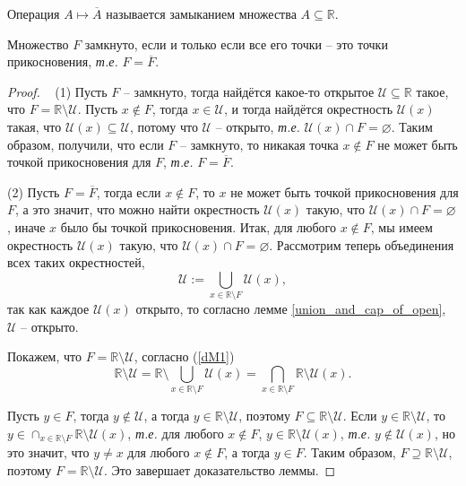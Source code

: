 \begin{definition}
    Операция $A \mapsto \overline{A}$ называется замыканием множества $A\subseteq \mathbb{R}.$
\end{definition}


\begin{lemma}\label{closure}
    Множество $F$ замкнуто, если и только если все его точки -- это точки прикосновения, \textit{т.е.} $F = \overline{F}.$ 
\end{lemma}
\begin{proof}~
 (1) Пусть $F$ -- замкнуто, тогда найдётся какое-то открытое $\mathscr{U} \subseteq \mathbb{R}$ такое, что $F  = \mathbb{R} \setminus \mathscr{U}$. Пусть $x \notin F$, тогда $x \in \mathscr{U}$, и тогда найдётся окрестность $\mathscr{U}(x)$ такая, что $\mathscr{U}(x) \subseteq \mathscr{U}$, потому что $\mathscr{U}$ -- открыто, \textit{т.е.} $\mathscr{U}(x) \cap F = \varnothing.$ Таким образом, получили, что если $F$ -- замкнуто, то никакая точка $x \notin F$ не может быть точкой прикосновения для $F$, \textit{т.е.} $F = \overline{F}.$ 

(2) Пусть $F = \overline{F}$, тогда если $x \notin F$, то $x$ не может быть точкой прикосновения для $F$, а это значит, что можно найти окрестность $\mathscr{U}(x)$ такую, что $\mathscr{U}(x) \cap F = \varnothing$, иначе $x$ было бы точкой прикосновения. Итак, для любого $x \notin F$, мы имеем окрестность $\mathscr{U}(x)$ такую, что $\mathscr{U}(x) \cap F = \varnothing$. Рассмотрим теперь объединения всех таких окрестностей,
\[
 \mathscr{U}:= \bigcup_{x \in \mathbb{R}\setminus F} \mathscr{U}(x),
\]
так как каждое $\mathscr{U}(x)$ открыто, то согласно лемме \ref{union_and_cap_of_open}, $\mathscr{U}$ -- открыто. 

Покажем, что $F = \mathbb{R} \setminus \mathscr{U}$, согласно (\ref{dM1})
\[
 \mathbb{R} \setminus \mathscr{U} = \mathbb{R} \setminus \bigcup_{x \in \mathbb{R}\setminus F} \mathscr{U}(x) = \bigcap_{x \in \mathbb{R} \setminus F} \mathbb{R} \setminus \mathscr{U}(x).
\]

Пусть $y \in F$, тогда $y \notin \mathscr{U}$, а тогда $y \in \mathbb{R}\setminus \mathscr{U}$, поэтому $F \subseteq \mathbb{R} \setminus \mathscr{U}$. Если $y \in \mathbb{R}\setminus \mathscr{U}$, то $y \in \cap_{x \in \mathbb{R} \setminus F} \mathbb{R} \setminus \mathscr{U}(x)$, \textit{т.е.} для любого $x \notin F$, $y \in \mathbb{R}\setminus \mathscr{U}(x)$, \textit{т.е.} $y \notin \mathscr{U}(x)$, но это значит, что $y \ne x$ для любого $x \notin F$, а тогда $y \in F$. Таким образом, $F \supseteq \mathbb{R} \setminus \mathscr{U}$, поэтому $F = \mathbb{R}\setminus \mathscr{U}.$ Это завершает доказательство леммы.
\end{proof}

